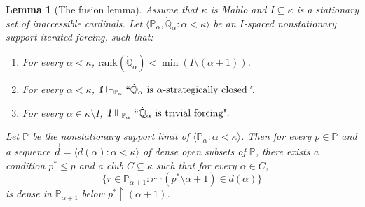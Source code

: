 \documentclass[10pt,a4paper]{amsart}
\newtheorem{lemma}{Lemma}
\newcommand{\la}{\langle}
\newcommand{\one}{\mathop{1\hskip-3pt {\rm l}}}
\newcommand{\po}{\mathbb{P}}
\newcommand{\qo}{\mathbb{Q}}
\newcommand{\ra}{\rangle}
\renewcommand{\restriction}{\mathbin\upharpoonright}    %
\begin{document}
\begin{lemma}[The fusion lemma]\label{Lemma: fusion lemma}
    Assume that $\kappa$ is Mahlo and $I\subseteq \kappa$ is a stationary set of inaccessible cardinals. Let $\la \po_\alpha, \dot{\qo}_\alpha \colon \alpha<\kappa \ra$ be an $I$-spaced nonstationary support iterated forcing, such that:
    \begin{enumerate}
        \item For every $\alpha<\kappa$, $\mathrm{rank}(\dot{\qo}_\alpha) < \min(I \setminus (\alpha+1))$.
        \item For every $\alpha< \kappa$, $\one \Vdash_{\po_\alpha} {``\dot{\qo}_\alpha \text{ is }\alpha\text{-strategically closed}}$".
        \item For every $\alpha\in \kappa\setminus I$, $\one \Vdash_{\po_\alpha} {``\dot{\qo}_\alpha \text{ is trivial forcing".}}$
       
    \end{enumerate}
    Let $\po$ be the nonstationary support limit of $\la \po_\alpha \colon \alpha<\kappa \ra$. Then for every $p\in \po$ and a sequence $\vec{d} = \la d(\alpha)\colon \alpha<\kappa \ra$ of dense open subsets of $\po$, there exists a condition $p^*\leq p$ and a club $C\subseteq \kappa$ such that for every $\alpha\in C$, 
    $$\{ r\in \po_{\alpha+1} \colon r^{\smallfrown} (p^*\setminus \alpha+1) \in d(\alpha) \}$$
    is dense in $\po_{\alpha+1}$ below $p^*\restriction (\alpha+1)$.
\end{lemma}
\end{document}
